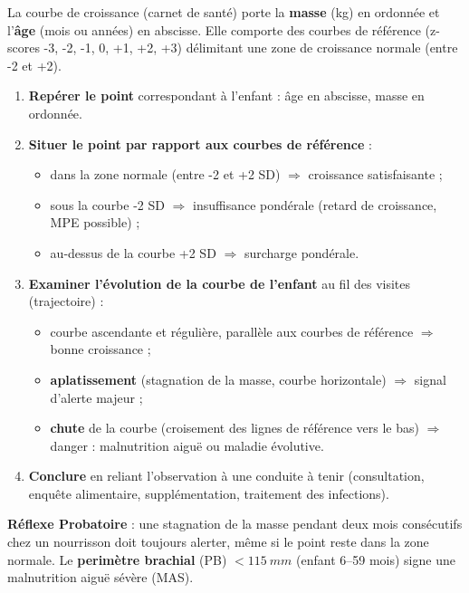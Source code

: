 \documentclass[11pt]{article}
\newcommand{\cle}[1]{{\popxbold\color{popdark}#1}}
\begin{document}
\begin{methode}
La courbe de croissance (carnet de santé) porte la \textbf{masse} (kg) en ordonnée et l'\textbf{âge} (mois ou années) en abscisse. Elle comporte des courbes de référence (z-scores -3, -2, -1, 0, +1, +2, +3) délimitant une zone de croissance normale (entre -2 et +2).
\begin{enumerate}
\item \textbf{Repérer le point} correspondant à l'enfant : âge en abscisse, masse en ordonnée.
\item \textbf{Situer le point par rapport aux courbes de référence} :
\begin{itemize}
\item dans la zone normale (entre -2 et +2 SD) $\Rightarrow$ croissance satisfaisante ;
\item sous la courbe -2 SD $\Rightarrow$ \cle{insuffisance pondérale} (retard de croissance, MPE possible) ;
\item au-dessus de la courbe +2 SD $\Rightarrow$ surcharge pondérale.
\end{itemize}
\item \textbf{Examiner l'évolution de la courbe de l'enfant} au fil des visites (trajectoire) :
\begin{itemize}
\item courbe ascendante et régulière, parallèle aux courbes de référence $\Rightarrow$ bonne croissance ;
\item \textbf{aplatissement} (stagnation de la masse, courbe horizontale) $\Rightarrow$ signal d'alerte majeur ;
\item \textbf{chute} de la courbe (croisement des lignes de référence vers le bas) $\Rightarrow$ danger : malnutrition aiguë ou maladie évolutive.
\end{itemize}
\item \textbf{Conclure} en reliant l'observation à une conduite à tenir (consultation, enquête alimentaire, supplémentation, traitement des infections).
\end{enumerate}
\textbf{Réflexe Probatoire} : une stagnation de la masse pendant deux mois consécutifs chez un nourrisson doit toujours alerter, même si le point reste dans la zone normale. Le \textbf{perimètre brachial} (PB) $< \SI{115}{mm}$ (enfant 6--59 mois) signe une malnutrition aiguë sévère (MAS).
\end{methode}
\end{document}
